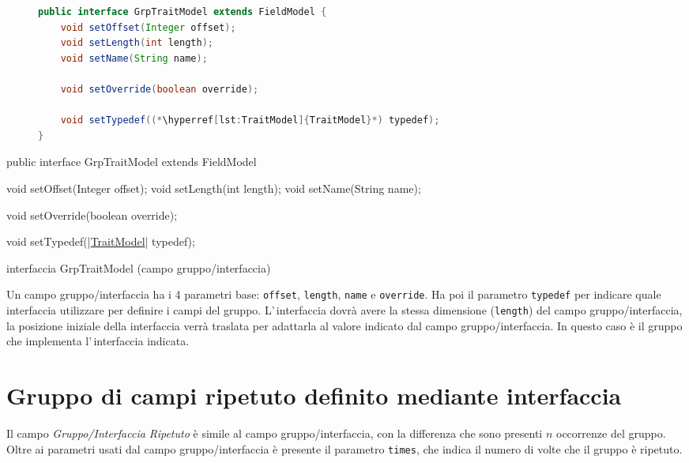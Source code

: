 \ifesource
\begin{figure*}[!htb]
\begin{lstlisting}[language=java, 
caption=interfaccia GrpTraitModel (campo gruppo/interfaccia), 
label=lst:GrpTraitModel]
public interface GrpTraitModel extends FieldModel {
    void setOffset(Integer offset);
    void setLength(int length);
    void setName(String name);
    
    void setOverride(boolean override);
    
    void setTypedef((*\hyperref[lst:TraitModel]{TraitModel}*) typedef);
}
\end{lstlisting}
\end{figure*}
\else
\begin{elisting}[!htb]
\begin{javacode}
public interface GrpTraitModel extends FieldModel {
    void setOffset(Integer offset);
    void setLength(int length);
    void setName(String name);
    
    void setOverride(boolean override);
    
    void setTypedef(|\hyperref[lst:TraitModel]{TraitModel}| typedef);
}
\end{javacode}
\caption{interfaccia GrpTraitModel (campo gruppo/interfaccia)}
\label{lst:GrpTraitModel}
\end{elisting}
\fi

Un campo gruppo/interfaccia ha i 4 parametri base: \verb!offset!, \verb!length!, 
\verb!name! e \verb!override!.
Ha poi il parametro \verb!typedef! per indicare quale interfaccia utilizzare per
definire i campi del gruppo. L'\,interfaccia dovrà avere la stessa dimensione 
(\verb!length!) del campo gruppo/interfaccia, la posizione iniziale della 
interfaccia verrà traslata per adattarla al valore indicato dal campo 
gruppo/interfaccia.
In questo caso è il gruppo che implementa l'\,interfaccia indicata.


\section{Gruppo di campi ripetuto definito mediante interfaccia}
Il campo \textsl{Gruppo/Interfaccia Ripetuto} è simile al campo 
gruppo/interfaccia, con la differenza che sono presenti $n$ occorrenze del 
gruppo. Oltre ai parametri usati dal campo gruppo/interfaccia è presente il 
parametro \verb!times!, che indica il numero di volte che il gruppo è ripetuto.


